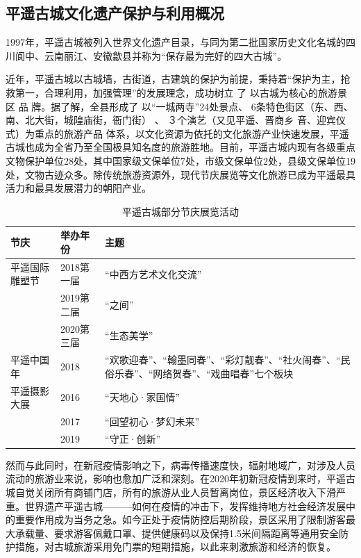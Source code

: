 \documentclass[UTF8]{ctexart}
\begin{document}
    \subsection{平遥古城文化遗产保护与利用概况}
    1997年，平遥古城被列入世界文化遗产目录，与同为第二批国家历史文化名城的四川阆中、云南丽江、安徽歙县并称为“保存最为完好的四大古城”。

    近年，平遥古城以古城墙，古街道，古建筑的保护为前提，秉持着“保护为主，抢救第一，合理利用，加强管理”的发展理念，成功树立 了 以古城为核心的旅游景区 品 牌。据了解，全县形成了 以“一城两寺”24处景点、 6条特色街区（东、西、南、北大街，城隍庙街，衙门街） 、 ３个演艺（又见平遥、晋商乡 音、迎宾仪式）为重点的旅游产品 体系，以文化资源为依托的文化旅游产业快速发展，平遥古城也成为全省乃至全国极具知名度的旅游胜地。目前，平遥古城内现有各级重点文物保护单位28处，其中国家级文保单位7处，市级文保单位2处，县级文保单位19处，文物古迹众多。除传统旅游资源外，现代节庆展览等文化旅游已成为平遥最具活力和最具发展潜力的朝阳产业。
    \begin{table}[H]
        \centering
        \caption{平遥古城部分节庆展览活动}
        \begin{tabular}{p{4cm}p{4cm}p{4cm}}
            \toprule
            节庆 & 举办年份 & 主题\\
            \midrule
            平遥国际雕塑节 & 2018第一届 &“中西方艺术文化交流”\\
            &2019第二届&“之间”\\
            &2020第三届&“生态美学”\\
            \cmidrule{1-3}
            平遥中国年&2018&“欢歌迎春”、“翰墨同春”、“彩灯靓春”、“社火闹春”、“民俗乐春”、“网络贺春”、“戏曲唱春”七个板块\\
            \cmidrule{1-3}
            平遥摄影大展&2016&“天地心·家国情”\\
            &2017&“回望初心·梦幻未来”\\
            &2019&“守正·创新”\\
            \bottomrule
        \end{tabular}
    \end{table}
    然而与此同时，在新冠疫情影响之下，病毒传播速度快，辐射地域广，对涉及人员流动的旅游业来说，影响也愈加广泛和深刻。在2020年初新冠疫情到来时，平遥古城自觉关闭所有商铺门店，所有的旅游从业人员暂离岗位，景区经济收入下滑严重。世界遗产平遥古城———如何在疫情的冲击下，发挥维持地方社会经济发展中的重要作用成为当务之急。如今正处于疫情防控后期阶段，景区采用了限制游客最大承载量、要求游客佩戴口罩、提供健康码以及保持1.5米间隔距离等通用安全防护措施，对古城旅游采用免门票的短期措施，以此来刺激旅游和经济的恢复。
\end{document}
